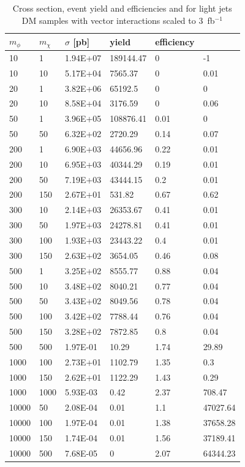 \begin{table}[]
\small
\centering
\begin{tabular}{llllll}
$m_\phi$  &  $m_\chi$   &  $\sigma$ [pb] &   yield &  efficiency \\\hline
10    & 1    & 1.94E+07 & 189144.47 & 0    & -1       \\
10    & 10   & 5.17E+04 & 7565.37   & 0    & 0.01     \\
20    & 1    & 3.82E+06 & 65192.5   & 0    & 0        \\
20    & 10   & 8.58E+04 & 3176.59   & 0    & 0.06     \\
50    & 1    & 3.96E+05 & 108876.41 & 0.01 & 0        \\
50    & 50   & 6.32E+02 & 2720.29   & 0.14 & 0.07     \\
200   & 1    & 6.90E+03 & 44656.96  & 0.22 & 0.01     \\
200   & 10   & 6.95E+03 & 40344.29  & 0.19 & 0.01     \\
200   & 50   & 7.19E+03 & 43444.15  & 0.2  & 0.01     \\
200   & 150  & 2.67E+01 & 531.82    & 0.67 & 0.62     \\
300   & 10   & 2.14E+03 & 26353.67  & 0.41 & 0.01     \\
300   & 50   & 1.97E+03 & 24278.81  & 0.41 & 0.01     \\
300   & 100  & 1.93E+03 & 23443.22  & 0.4  & 0.01     \\
300   & 150  & 2.63E+02 & 3654.05   & 0.46 & 0.08     \\
500   & 1    & 3.25E+02 & 8555.77   & 0.88 & 0.04     \\
500   & 10   & 3.48E+02 & 8040.21   & 0.77 & 0.04     \\
500   & 50   & 3.43E+02 & 8049.56   & 0.78 & 0.04     \\
500   & 100  & 3.42E+02 & 7788.44   & 0.76 & 0.04     \\
500   & 150  & 3.28E+02 & 7872.85   & 0.8  & 0.04     \\
500   & 500  & 1.97E-01 & 10.29     & 1.74 & 29.89    \\
1000  & 100  & 2.73E+01 & 1102.79   & 1.35 & 0.3      \\
1000  & 150  & 2.62E+01 & 1122.29   & 1.43 & 0.29     \\
1000  & 1000 & 5.93E-03 & 0.42      & 2.37 & 708.47   \\
10000 & 50   & 2.08E-04 & 0.01      & 1.1  & 47027.64 \\
10000 & 100  & 1.97E-04 & 0.01      & 1.38 & 37658.28 \\
10000 & 150  & 1.74E-04 & 0.01      & 1.56 & 37189.41 \\
10000 & 500  & 7.68E-05 & 0         & 2.07 & 64344.23 \\\hline
\end{tabular}
\caption{Cross section, event yield and efficiencies and for light jets DM samples with vector interactions scaled to 3~fb$^{-1 }$}
\label{tab:dm_V_g1_3fb}
\end{table}




